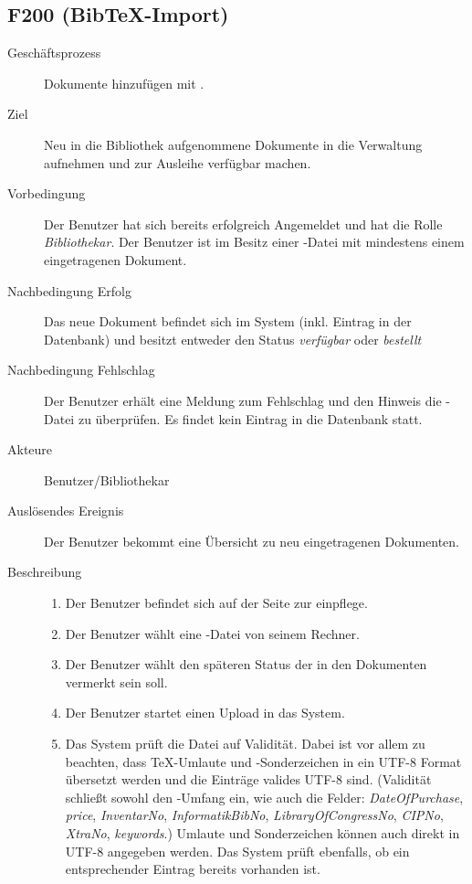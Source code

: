 \subsection{F200 (Bib\TeX-Import)}
\begin{description}
  \item[Geschäftsprozess]Dokumente hinzufügen mit \BibTeX.
  \item[Ziel]Neu in die Bibliothek aufgenommene Dokumente in die Verwaltung aufnehmen und zur Ausleihe verfügbar machen.
  \item[Vorbedingung]Der Benutzer hat sich bereits erfolgreich Angemeldet und hat die Rolle \emph{Bibliothekar}. Der Benutzer ist im Besitz einer \BibTeX -Datei mit mindestens einem eingetragenen Dokument.
  \item[Nachbedingung Erfolg]Das neue Dokument befindet sich im System (inkl. Eintrag in der Datenbank) und besitzt entweder den Status \emph{verfügbar} oder \emph{bestellt}
  \item[Nachbedingung Fehlschlag]Der Benutzer erhält eine Meldung zum Fehlschlag und den Hinweis die \BibTeX -Datei zu überprüfen. Es findet kein Eintrag in die Datenbank statt.
  \item[Akteure]Benutzer/Bibliothekar
  \item[Auslösendes Ereignis]Der Benutzer bekommt eine Übersicht zu neu eingetragenen Dokumenten.
  \item[Beschreibung]\hfill
    \begin{enumerate}
      \item Der Benutzer befindet sich auf der Seite zur \BibTeX einpflege.
      \item Der Benutzer wählt eine \BibTeX -Datei von seinem Rechner.
      \item Der Benutzer wählt den späteren Status der in den Dokumenten vermerkt sein soll.
      \item Der Benutzer startet einen Upload in das System.
      \item Das System prüft die Datei auf Validität. Dabei ist vor allem zu beachten, dass \TeX-Umlaute und -Sonderzeichen in ein UTF-8 Format übersetzt werden und die Einträge valides UTF-8 sind.
	(Validität schließt sowohl den \BibTeX -Umfang ein, wie auch die Felder: \emph{DateOfPurchase}, \emph{price}, \emph{InventarNo}, \emph{InformatikBibNo}, \emph{LibraryOfCongressNo}, \emph{CIPNo}, \emph{XtraNo}, \emph{keywords}.) Umlaute und Sonderzeichen können auch direkt in UTF-8 angegeben werden.
	Das System prüft ebenfalls, ob ein entsprechender Eintrag bereits vorhanden ist.

\end{enumerate}
\end{description}

